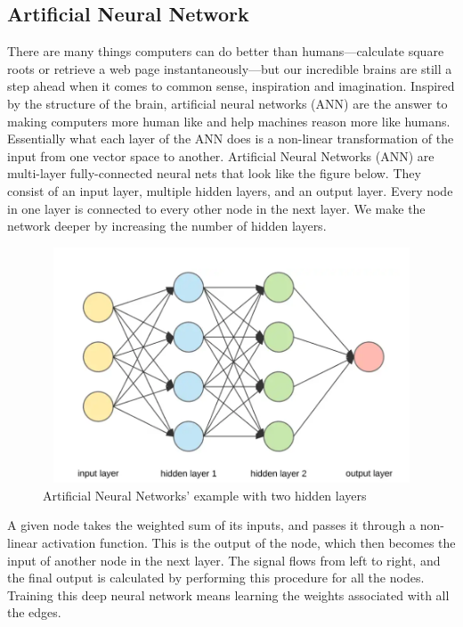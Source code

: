 \documentclass{article}
\begin{document}
\subsection{Artificial Neural Network}
There are many things computers can do better than humans—calculate square roots or retrieve a web page instantaneously—but our incredible brains are still a step ahead when it comes to common sense, inspiration and imagination. Inspired by the structure of the brain, artificial neural networks (ANN) are the answer to making computers more human like and help machines reason more like humans.
Essentially what each layer of the ANN does is a non-linear transformation of the input from one vector space to another.
Artificial Neural Networks (ANN) are multi-layer fully-connected neural nets that look like the figure below. They consist of an input layer, multiple hidden layers, and an output layer. Every node in one layer is connected to every other node in the next layer. We make the network deeper by increasing the number of hidden layers.

 \begin{figure}[H]
\centering
\includegraphics[width=115mm,height=70mm]{images/ann-image.png}
\caption{\label{fig:correlation}Artificial Neural Networks' example with two hidden layers }
\label{6}
\end{figure}
A given node takes the weighted sum of its inputs, and passes it through a non-linear activation function. This is the output of the node, which then becomes the input of another node in the next layer. The signal flows from left to right, and the final output is calculated by performing this procedure for all the nodes. Training this deep neural network means learning the weights associated with all the edges.
\end{document}
